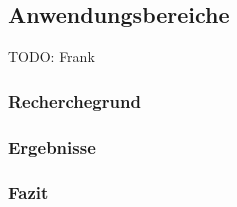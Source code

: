 \subsection{Anwendungsbereiche}

TODO: Frank

\subsubsection{Recherchegrund}


\subsubsection{Ergebnisse}



\subsubsection{Fazit}

\clearpage 




